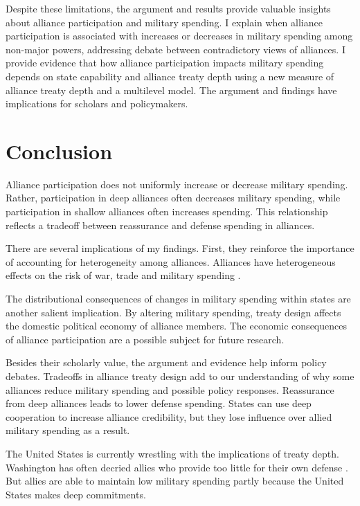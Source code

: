 \documentclass[12pt]{article}
\begin{document}
Despite these limitations, the argument and results provide valuable insights about alliance participation and military spending. 
I explain when alliance participation is associated with increases or decreases in military spending among non-major powers, addressing debate between contradictory views of alliances.  
I provide evidence that how alliance participation impacts military spending depends on state capability and alliance treaty depth using a new measure of alliance treaty depth and a multilevel model. 
The argument and findings have implications for scholars and policymakers. 


\section{Conclusion}

Alliance participation does not uniformly increase or decrease military spending. 
Rather, participation in deep alliances often decreases military spending, while participation in shallow alliances often increases spending. 
This relationship reflects a tradeoff between reassurance and defense spending in alliances. 


There are several implications of my findings.  
First, they reinforce the importance of accounting for heterogeneity among alliances.
Alliances have heterogeneous effects on the risk of war, trade and military spending \citep{Leeds2003, LongLeeds2006, Benson2012, DigiuseppePoast2016}. 


The distributional consequences of changes in military spending within states are another salient implication.  
By altering military spending, treaty design affects the domestic political economy of alliance members. 
The economic consequences of alliance participation are a possible subject for future research. 


Besides their scholarly value, the argument and evidence help inform policy debates. 
Tradeoffs in alliance treaty design add to our understanding of why some alliances reduce military spending and possible policy responses. 
Reassurance from deep alliances leads to lower defense spending. 
States can use deep cooperation to increase alliance credibility, but they lose influence over allied military spending as a result. 


The United States is currently wrestling with the implications of treaty depth. 
Washington has often decried allies who provide too little for their own defense \citep{Lanoszka2015}. 
But allies are able to maintain low military spending partly because the United States makes deep commitments. 
\end{document}
